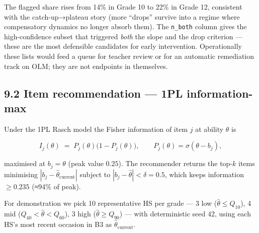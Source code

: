 \documentclass[
]{article}
\begin{document}
The flagged share rises from 14\% in Grade 10 to 22\% in Grade 12,
consistent with the catch-up→plateau story (more ``drops'' survive into
a regime where compensatory dynamics no longer absorb them). The
\texttt{n\_both} column gives the high-confidence subset that triggered
\emph{both} the slope and the drop criterion --- these are the most
defensible candidates for early intervention. Operationally these lists
would feed a queue for teacher review or for an automatic remediation
track on OLM; they are not endpoints in themselves.

\hypertarget{item-recommendation-1pl-information-max}{%
\subsection{9.2 Item recommendation --- 1PL
information-max}\label{item-recommendation-1pl-information-max}}

Under the 1PL Rasch model the Fisher information of item \(j\) at
ability \(\theta\) is

\[
I_j(\theta) \;=\; P_j(\theta)\bigl(1 - P_j(\theta)\bigr),\qquad P_j(\theta) = \sigma(\theta - b_j),
\]

maximised at \(b_j = \theta\) (peak value \(0.25\)). The recommender
returns the top-\(k\) items minimising
\(|b_j - \hat\theta_{\text{current}}|\) subject to
\(|b_j - \hat\theta| < \delta = 0.5\), which keeps information
\(\geq 0.235\) (≈94\% of peak).

For demonstration we pick 10 representative HS per grade --- 3 low
(\(\hat\theta \leq Q_{10}\)), 4 mid (\(Q_{40} < \hat\theta < Q_{60}\)),
3 high (\(\hat\theta \geq Q_{90}\)) --- with deterministic seed 42,
using each HS's most recent occasion in B3 as
\(\hat\theta_{\text{current}}\).
\end{document}
